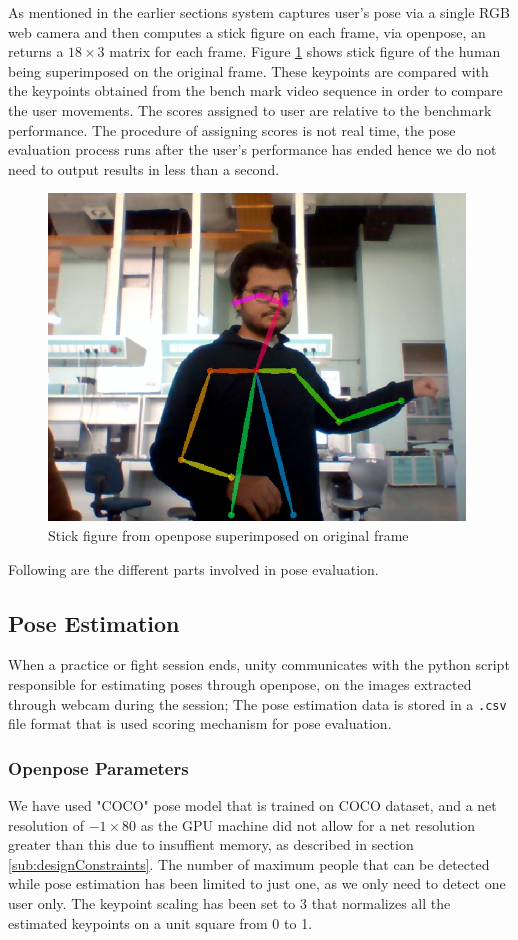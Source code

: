As mentioned in the earlier sections system captures user's pose via a single RGB web camera and then computes a stick figure on each frame, via openpose, an returns a $18 \times 3$ matrix for each frame. Figure \ref{fig:stickFigure} shows stick figure of the human being superimposed on the original frame. These keypoints are compared with the keypoints obtained from the bench mark video sequence in order to compare the user movements. The scores assigned to user are relative to the benchmark performance. The procedure of assigning scores is not real time, the pose evaluation process runs after the user's performance has ended hence we do not need to output results in less than a second. 

\begin{figure}
    \centering
    \includegraphics[scale=.75]{images/sketeton.png}
    \caption{Stick figure from openpose superimposed on original frame}
    \label{fig:stickFigure}
\end{figure}

Following are the different parts involved in pose evaluation.

\subsection{Pose Estimation}
When a practice or fight session ends, unity communicates with the python script responsible for estimating poses through openpose, on the images extracted through webcam during the session; %
The pose estimation data is stored in a \texttt{.csv} file format that is used scoring mechanism for pose evaluation. 

\subsubsection{Openpose Parameters}
We have used "COCO" pose model that is trained on COCO dataset, and a net resolution of $-1 \times 80$ as the GPU machine did not allow for a net resolution greater than this due to insuffient memory, as described in section \ref{sub:designConstraints}. The number of maximum people that can be detected while pose estimation has been limited to just one, as we only need to detect one user only. The keypoint scaling has been set to 3 that normalizes all the estimated keypoints on a unit square from 0 to 1. 

